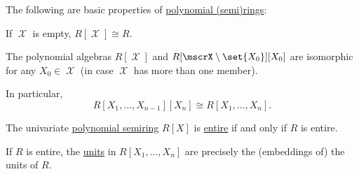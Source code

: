 \begin{proposition}\label{thm:def:polynomial_semiring}
  The following are basic properties of \hyperref[def:polynomial_semiring]{polynomial (semi)rings}:
  \begin{thmenum}
     If \( \mscrX \) is empty, \( R[\mscrX] \cong R \).

     The polynomial algebras \( R[\mscrX] \) and \( R[\mscrX \setminus \set{ X_0 }][X_0] \) are isomorphic for any \( X_0 \in \mscrX \) (in case \( \mscrX \) has more than one member).

    In particular,
    \begin{equation*}
      R[X_1, \ldots, X_{n-1}][X_n] \cong R[X_1, \ldots, X_n].
    \end{equation*}

     The univariate \hyperref[def:polynomial_semiring]{polynomial semiring} \( R[X] \) is \hyperref[def:divisibility/zero]{entire} if and only if \( R \) is entire.

     If \( R \) is entire, the \hyperref[def:divisibility/unit]{units} in \( R[X_1, \ldots, X_n] \) are precisely the (embeddings of) the units of \( R \).
  \end{thmenum}
\end{proposition}
